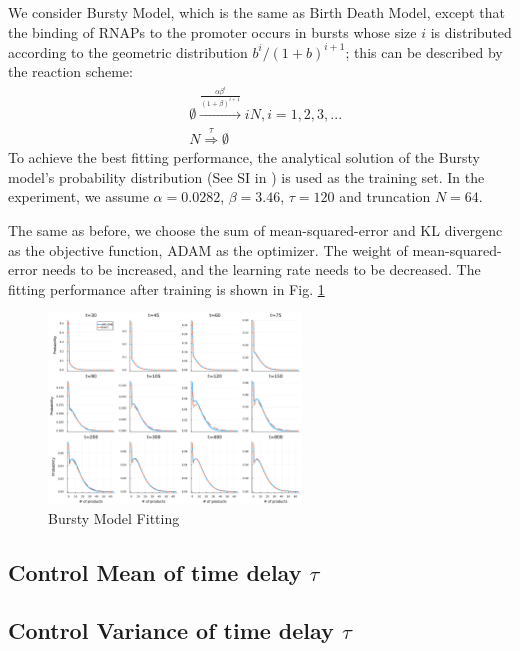 \documentclass[a4paper,10pt]{article}
\begin{document}
We consider Bursty Model, which is the same as Birth Death Model, except that the binding of RNAPs to the promoter occurs in bursts whose size $i$ is distributed according to the geometric distribution $b^i/(1 + b)^{i+1}$; this can be described by the reaction scheme:
\begin{equation}\label{birth-death}
	\begin{aligned}
		&\emptyset\stackrel{\frac{\alpha\beta^i}{(1+\beta)^{i+1}}}\longrightarrow iN,i=1,2,3,...\\ &N\stackrel{\tau}\Rightarrow\emptyset
	\end{aligned}
\end{equation}
To achieve the best fitting performance, the analytical solution of the Bursty model's probability distribution (See SI in \cite{jiang2021neural}) is used as the training set. In the experiment, we assume $\alpha=0.0282$, $\beta=3.46$, $\tau=120$ and truncation $N=64$.

The same as before, we choose the sum of mean-squared-error and KL divergenc as the  objective  function, ADAM as the optimizer. The weight of mean-squared-error needs to be increased, and the learning rate needs to be decreased. The fitting performance after training is shown in Fig. \ref{Bursty Model Fitting}
\begin{figure}[h]
	\centering
	\includegraphics[width=0.6\textwidth]{Figs/Bursty_fitting.pdf}
	\caption{Bursty Model Fitting}\label{Bursty Model Fitting}  
\end{figure}

\subsection{Control Mean of time delay $\tau$}

\subsection{Control Variance of time delay $\tau$}
\end{document}
